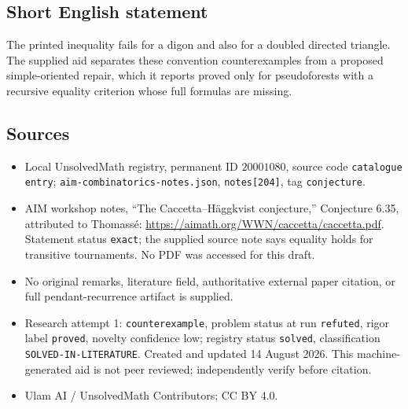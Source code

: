 \documentclass[11pt]{article}
\begin{document}
\subsection{Short English statement}
The printed inequality fails for a digon and also for a doubled directed triangle. The supplied aid separates these convention counterexamples from a proposed simple-oriented repair, which it reports proved only for pseudoforests with a recursive equality criterion whose full formulas are missing.
\subsection{Sources}
\begin{itemize}
\item Local UnsolvedMath registry, permanent ID \(20001080\), source code \texttt{catalogue entry}; \texttt{aim-combinatorics-notes.json}, \texttt{notes[204]}, tag \texttt{conjecture}.
\item AIM workshop notes, ``The Caccetta--H\"aggkvist conjecture,'' Conjecture 6.35, attributed to Thomass\'e: \url{https://aimath.org/WWN/caccetta/caccetta.pdf}. Statement status \texttt{exact}; the supplied source note says equality holds for transitive tournaments. No PDF was accessed for this draft.
\item No original remarks, literature field, authoritative external paper citation, or full pendant-recurrence artifact is supplied.
\item Research attempt 1: \texttt{counterexample}, problem status at run \texttt{refuted}, rigor label \texttt{proved}, novelty confidence low; registry status \texttt{solved}, classification \texttt{SOLVED-IN-LITERATURE}. Created and updated 14 August 2026. This machine-generated aid is not peer reviewed; independently verify before citation.
\item Ulam AI / UnsolvedMath Contributors; CC BY 4.0.
\end{itemize}
\end{document}

